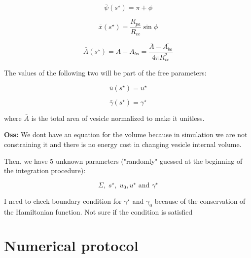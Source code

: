 \documentclass[12pt]{article}
\begin{document}
$$
\bar{\psi}(s^\star) = \pi + \phi
$$

$$
\bar{x}(s^\star) = \frac{R_{pa}}{R_{ve}} \sin \phi 
$$

$$
\bar{A}(s^\star) = A - A_{bo} = \frac{\bar{A} - \bar{A_{bo}}}{4 \pi R_{ve}^2}
$$

The values of the following two will be part of the free parameters:

$$
\bar{u}(s^\star) = u^\star
$$

$$
\bar{\gamma}(s^\star) = \gamma^\star
$$

where $\bar{A}$ is the total area of vesicle normalized to make it unitless.

\textbf{Oss:} We dont have an equation for the volume because in simulation we are not constraining it and there is no energy cost in changing vesicle internal volume. 

Then, we have 5 unknown parameters ("randomly" guessed at the beginning of the integration procedure):

$$\Sigma,\; s^\star ,\;u_0,u^\star \text{ and } \gamma^\star$$



\alert{I need to check boundary condition for $\gamma^\star$ and $\gamma_0$ because of the conservation of the Hamiltonian function. Not sure if the condition is satisfied}

\section{Numerical protocol}
\end{document}
